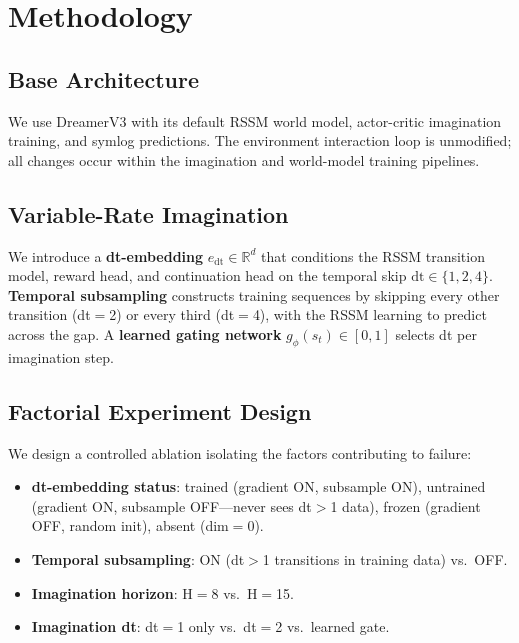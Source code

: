 \documentclass[10pt,letterpaper]{article}
\begin{document}
\section{Methodology}

\subsection{Base Architecture}

We use DreamerV3 \citep{hafner2023dreamerv3} with its default RSSM world model, actor-critic imagination training, and symlog predictions.
The environment interaction loop is unmodified; all changes occur within the imagination and world-model training pipelines.

\subsection{Variable-Rate Imagination}

We introduce a \textbf{dt-embedding} $e_{\text{dt}} \in \mathbb{R}^d$ that conditions the RSSM transition model, reward head, and continuation head on the temporal skip $\text{dt} \in \{1,2,4\}$.
\textbf{Temporal subsampling} constructs training sequences by skipping every other transition (dt$=$2) or every third (dt$=$4), with the RSSM learning to predict across the gap.
A \textbf{learned gating network} $g_\phi(s_t) \in [0,1]$ selects dt per imagination step.

\subsection{Factorial Experiment Design}

We design a controlled ablation isolating the factors contributing to failure:

\begin{itemize}
    \item \textbf{dt-embedding status}: trained (gradient ON, subsample ON), untrained (gradient ON, subsample OFF---never sees dt$>$1 data), frozen (gradient OFF, random init), absent (dim$=$0).
    \item \textbf{Temporal subsampling}: ON (dt$>$1 transitions in training data) vs.\ OFF.
    \item \textbf{Imagination horizon}: H$=$8 vs.\ H$=$15.
    \item \textbf{Imagination dt}: dt$=$1 only vs.\ dt$=$2 vs.\ learned gate.
\end{itemize}
\end{document}
